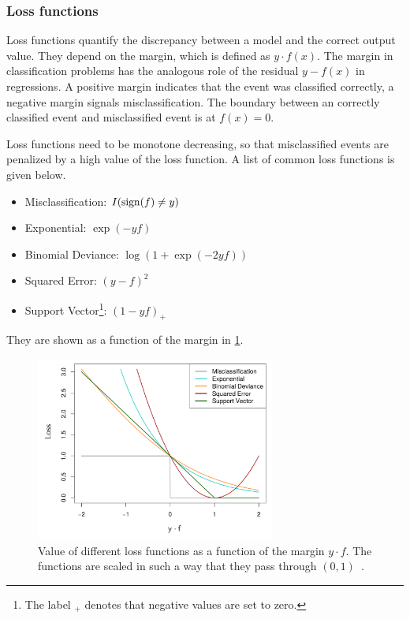 \subsubsection{Loss functions}\label{subsub:bdt:boosting:lossfunction}

Loss functions quantify the discrepancy between a model and the correct output value.
They depend on the margin, which is defined as $y \cdot f(x)$.
The margin in classification problems has the analogous role of the residual $y - f(x)$ in regressions.
A positive margin indicates that the event was classified correctly, a negative margin signals misclassification.
The boundary between an correctly classified event and misclassified event is at $f(x) = 0$.

Loss functions need to be monotone decreasing, so that misclassified events are penalized by a high value
of the loss function.
A list of common loss functions is given below.
\begin{itemize}
    \item Misclassification: $I(\operatorname{sign}(f) \neq y)$
    \item Exponential: $\exp(-yf)$
    \item Binomial Deviance: $\log (1 + \exp(-2yf))$
    \item Squared Error: ${(y-f)}^2$
    \item Support Vector\footnote{The label ${}_+$ denotes that negative values are set to zero.}: ${(1-yf)}_+$
\end{itemize}
They are shown as a function of the margin in \cref{fig:bdt:loss_functions}.

\begin{figure}[htb]
    \centering
    \includegraphics[width=0.7\textwidth]{./figures/bdts/loss_functions.png}
    \caption{Value of different loss functions as a function of the margin $y \cdot f$.
             The functions are scaled in such a way that they pass through $(0, 1)$~\cite{Hastie2009}.}\label{fig:bdt:loss_functions}
\end{figure}


